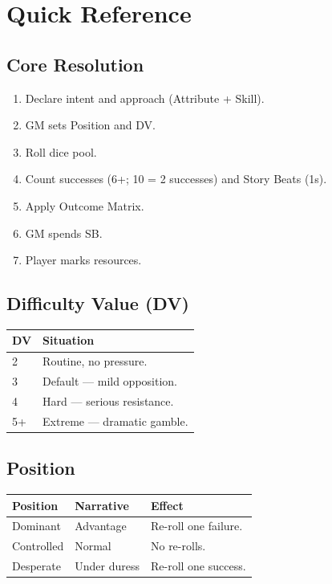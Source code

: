 \documentclass[11pt]{book}
\begin{document}
\appendix
\chapter{Quick Reference}
\label{ch:quick-reference}

\section{Core Resolution}

\begin{enumerate}
  \item Declare intent and approach (Attribute + Skill).
  \item GM sets Position and DV.
  \item Roll dice pool.
  \item Count successes (6+; 10 = 2 successes) and Story Beats (1s).
  \item Apply Outcome Matrix.
  \item GM spends SB.
  \item Player marks resources.
\end{enumerate}

\section{Difficulty Value (DV)}

\begin{center}
\begin{tabular}{ll}
\toprule
\textbf{DV} & \textbf{Situation} \\
\midrule
2 & Routine, no pressure. \\
3 & Default --- mild opposition. \\
4 & Hard --- serious resistance. \\
5+ & Extreme --- dramatic gamble. \\
\bottomrule
\end{tabular}
\end{center}

\section{Position}

\begin{center}
\begin{tabular}{lll}
\toprule
\textbf{Position} & \textbf{Narrative} & \textbf{Effect} \\
\midrule
Dominant & Advantage & Re-roll one failure. \\
Controlled & Normal & No re-rolls. \\
Desperate & Under duress & Re-roll one success. \\
\bottomrule
\end{tabular}
\end{center}
\end{document}
